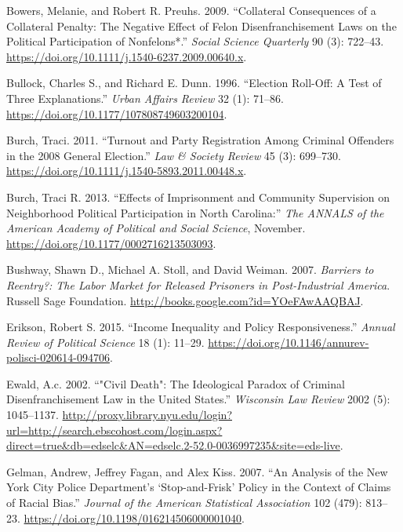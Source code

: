 \documentclass[
  12pt,
]{article}
\newlength{\cslhangindent}
\newenvironment{cslreferences}%
  {\setlength{\parindent}{0pt}%
  \everypar{\setlength{\hangindent}{\cslhangindent}}\ignorespaces}%
  {\par}
\begin{document}
\begin{cslreferences}
\leavevmode\hypertarget{ref-Bowers2009}{}%
Bowers, Melanie, and Robert R. Preuhs. 2009. ``Collateral Consequences of a Collateral Penalty: The Negative Effect of Felon Disenfranchisement Laws on the Political Participation of Nonfelons*.'' \emph{Social Science Quarterly} 90 (3): 722--43. \url{https://doi.org/10.1111/j.1540-6237.2009.00640.x}.

\leavevmode\hypertarget{ref-Bullock1996}{}%
Bullock, Charles S., and Richard E. Dunn. 1996. ``Election Roll-Off: A Test of Three Explanations.'' \emph{Urban Affairs Review} 32 (1): 71--86. \url{https://doi.org/10.1177/107808749603200104}.

\leavevmode\hypertarget{ref-Burch2011}{}%
Burch, Traci. 2011. ``Turnout and Party Registration Among Criminal Offenders in the 2008 General Election.'' \emph{Law \& Society Review} 45 (3): 699--730. \url{https://doi.org/10.1111/j.1540-5893.2011.00448.x}.

\leavevmode\hypertarget{ref-Burch2013}{}%
Burch, Traci R. 2013. ``Effects of Imprisonment and Community Supervision on Neighborhood Political Participation in North Carolina:'' \emph{The ANNALS of the American Academy of Political and Social Science}, November. \url{https://doi.org/10.1177/0002716213503093}.

\leavevmode\hypertarget{ref-Bushway2007}{}%
Bushway, Shawn D., Michael A. Stoll, and David Weiman. 2007. \emph{Barriers to Reentry?: The Labor Market for Released Prisoners in Post-Industrial America}. Russell Sage Foundation. \url{http://books.google.com?id=YOeFAwAAQBAJ}.

\leavevmode\hypertarget{ref-Erikson2015}{}%
Erikson, Robert S. 2015. ``Income Inequality and Policy Responsiveness.'' \emph{Annual Review of Political Science} 18 (1): 11--29. \url{https://doi.org/10.1146/annurev-polisci-020614-094706}.

\leavevmode\hypertarget{ref-Ewald2002}{}%
Ewald, A.c. 2002. ``"Civil Death": The Ideological Paradox of Criminal Disenfranchisement Law in the United States.'' \emph{Wisconsin Law Review} 2002 (5): 1045--1137. \url{http://proxy.library.nyu.edu/login?url=http://search.ebscohost.com/login.aspx?direct=true\&db=edselc\&AN=edselc.2-52.0-0036997235\&site=eds-live}.

\leavevmode\hypertarget{ref-Gelman2007}{}%
Gelman, Andrew, Jeffrey Fagan, and Alex Kiss. 2007. ``An Analysis of the New York City Police Department's `Stop-and-Frisk' Policy in the Context of Claims of Racial Bias.'' \emph{Journal of the American Statistical Association} 102 (479): 813--23. \url{https://doi.org/10.1198/016214506000001040}.


\end{cslreferences}
\end{document}
